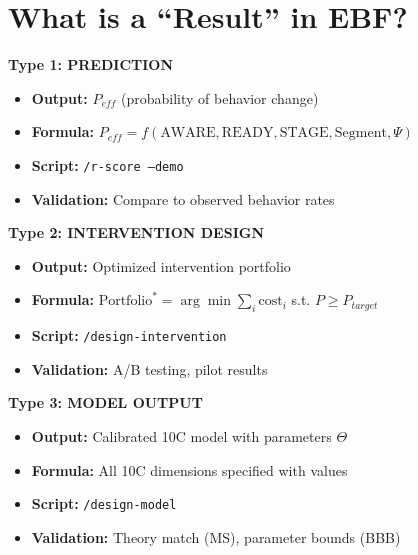\section{What is a ``Result'' in EBF?}
\label{sec:dp-results}

\begin{tcolorbox}[colback=blue!5!white, colframe=blue!75!black,
    title=\textbf{The Four Result Types}]

\textbf{Type 1: PREDICTION}
\begin{itemize}[nosep]
    \item \textbf{Output:} $P_{eff}$ (probability of behavior change)
    \item \textbf{Formula:} $P_{eff} = f(\text{AWARE}, \text{READY}, \text{STAGE}, \text{Segment}, \Psi)$
    \item \textbf{Script:} \texttt{/r-score --demo}
    \item \textbf{Validation:} Compare to observed behavior rates
\end{itemize}

\vspace{0.5em}
\textbf{Type 2: INTERVENTION DESIGN}
\begin{itemize}[nosep]
    \item \textbf{Output:} Optimized intervention portfolio
    \item \textbf{Formula:} $\text{Portfolio}^* = \arg\min \sum_i \text{cost}_i$ s.t. $P \geq P_{target}$
    \item \textbf{Script:} \texttt{/design-intervention}
    \item \textbf{Validation:} A/B testing, pilot results
\end{itemize}

\vspace{0.5em}
\textbf{Type 3: MODEL OUTPUT}
\begin{itemize}[nosep]
    \item \textbf{Output:} Calibrated 10C model with parameters $\Theta$
    \item \textbf{Formula:} All 10C dimensions specified with values
    \item \textbf{Script:} \texttt{/design-model}
    \item \textbf{Validation:} Theory match (MS), parameter bounds (BBB)
\end{itemize}


\end{tcolorbox}
